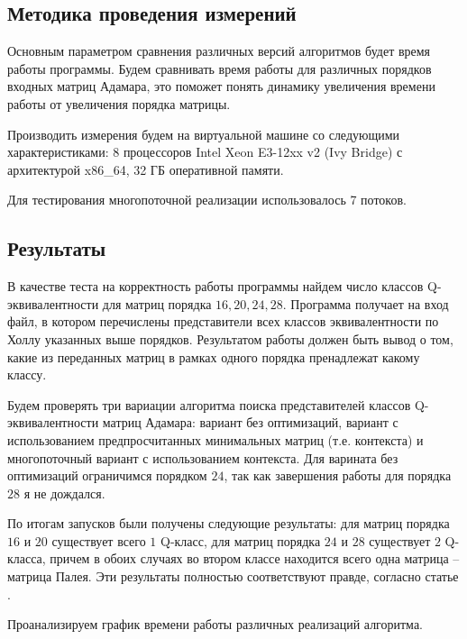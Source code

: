 \documentclass[a4paper, 14pt]{extreport}
\begin{document}
\subsection{Методика проведения измерений}

Основным параметром сравнения различных версий алгоритмов будет время работы программы. Будем сравнивать время работы для различных порядков входных матриц Адамара, это поможет понять динамику увеличения времени работы от увеличения порядка матрицы.

Производить измерения будем на виртуальной машине со следующими характеристиками: 8 процессоров Intel Xeon E3-12xx v2 (Ivy Bridge) с архитектурой x86\_64, 32 ГБ оперативной памяти.

Для тестирования многопоточной реализации использовалось 7 потоков.

\subsection{Результаты}

В качестве теста на корректность работы программы найдем число классов Q-эквивалентности для матриц порядка $16, 20, 24, 28$. Программа получает на вход файл, в котором перечислены представители всех классов эквивалентности по Холлу указанных выше порядков. Результатом работы должен быть вывод о том, какие из переданных матриц в рамках одного порядка пренадлежат какому классу.

Будем проверять три вариации алгоритма поиска представителей классов Q-эквивалентности матриц Адамара: вариант без оптимизаций, вариант с использованием предпросчитанных минимальных матриц (т.е. контекста) и многопоточный вариант с использованием контекста. Для варината без оптимизаций ограничимся порядком $24$, так как завершения работы для порядка $28$ я не дождался.

По итогам запусков были получены следующие результаты: для матриц порядка $16$ и $20$ существует всего $1$ Q-класс, для матриц порядка $24$ и $28$ существует $2$ Q-класса, причем в обоих случаях во втором классе находится всего одна матрица -- матрица Палея. Эти результаты полностью соответствуют правде, согласно статье \cite{orrick:so}.

Проанализируем график времени работы различных реализаций алгоритма.
\end{document}
